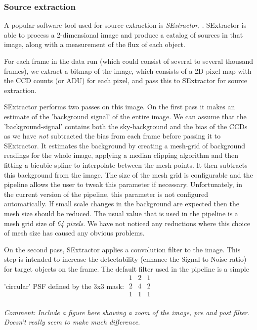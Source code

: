 \subsubsection{Source extraction}
A popular software tool used for source extraction is \emph{SExtractor}, \cite{bertin}. SExtractor is able to process a 2-dimensional image and produce a catalog of sources in that image, along with a measurement of the flux of each object. 

For each frame in the data run (which could consist of several to several thousand frames), we extract a bitmap of the image, which consists of a 2D pixel map with the CCD counts (or ADU) for each pixel, and pass this to SExtractor for source extraction. 

SExtractor performs two passes on this image. On the first pass it makes an estimate of the 'background signal' of the entire image. We can assume that the 'background-signal' contains both the sky-background and the bias of the CCDs as we have \emph{not} subtracted the bias from each frame before passing it to SExtractor. It estimates the background by creating a mesh-grid of background readings for the whole image, applying a median clipping algorithm and then fitting a bicubic spline to interpolate between the mesh points. It then subtracts this background from the image. The size of the mesh grid is configurable and the pipeline allows the user to tweak this parameter if necessary. Unfortunately, in the current version of the pipeline, this parameter is not configured automatically.  If small scale changes in the background are expected then the mesh size should be reduced. The usual value that is used in the pipeline is a mesh grid size of \emph{64 pixels}. We have not noticed any reductions where this choice of mesh size has caused any obvious problems. 

On the second pass, SExtractor applies a convolution filter to the image. This step is intended to increase the detectability (enhance the Signal to Noise ratio) for target objects on the frame. The default filter used in the pipeline is a simple 'circular' PSF defined by the 3x3 mask:
$
\begin{array}{ccc}
  1 & 2 & 1 \\
  2 & 4 & 2 \\
  1 & 1 & 1 \\
\end{array}  
$

\emph{Comment: Include a figure here showing a zoom of the image, pre and post filter. Doesn't really seem to make much difference.} 

